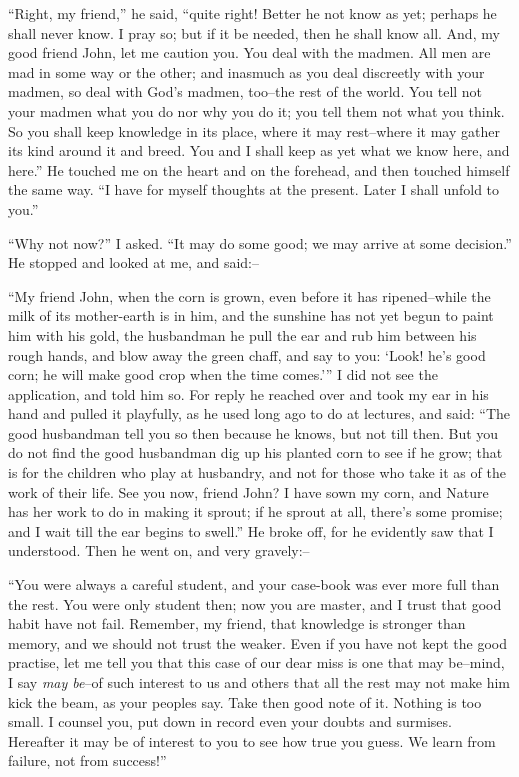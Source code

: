 \documentclass[12pt,openright]{book}
\begin{document}
“Right, my friend,” he said, “quite right! Better he not know as yet; perhaps he shall never know. I pray so; but if it be needed, then he shall know all. And, my good friend John, let me caution you. You deal with the madmen. All men are mad in some way or the other; and inasmuch as you deal discreetly with your madmen, so deal with God’s madmen, too–the rest of the world. You tell not your madmen what you do nor why you do it; you tell them not what you think. So you shall keep knowledge in its place, where it may rest–where it may gather its kind around it and breed. You and I shall keep as yet what we know here, and here.” He touched me on the heart and on the forehead, and then touched himself the same way. “I have for myself thoughts at the present. Later I shall unfold to you.”

“Why not now?” I asked. “It may do some good; we may arrive at some decision.” He stopped and looked at me, and said:–

“My friend John, when the corn is grown, even before it has ripened–while the milk of its mother-earth is in him, and the sunshine has not yet begun to paint him with his gold, the husbandman he pull the ear and rub him between his rough hands, and blow away the green chaff, and say to you: ‘Look! he’s good corn; he will make good crop when the time comes.’” I did not see the application, and told him so. For reply he reached over and took my ear in his hand and pulled it playfully, as he used long ago to do at lectures, and said: “The good husbandman tell you so then because he knows, but not till then. But you do not find the good husbandman dig up his planted corn to see if he grow; that is for the children who play at husbandry, and not for those who take it as of the work of their life. See you now, friend John? I have sown my corn, and Nature has her work to do in making it sprout; if he sprout at all, there’s some promise; and I wait till the ear begins to swell.” He broke off, for he evidently saw that I understood. Then he went on, and very gravely:–

“You were always a careful student, and your case-book was ever more full than the rest. You were only student then; now you are master, and I trust that good habit have not fail. Remember, my friend, that knowledge is stronger than memory, and we should not trust the weaker. Even if you have not kept the good practise, let me tell you that this case of our dear miss is one that may be–mind, I say \textit{may be}–of such interest to us and others that all the rest may not make him kick the beam, as your peoples say. Take then good note of it. Nothing is too small. I counsel you, put down in record even your doubts and surmises. Hereafter it may be of interest to you to see how true you guess. We learn from failure, not from success!”
\end{document}
